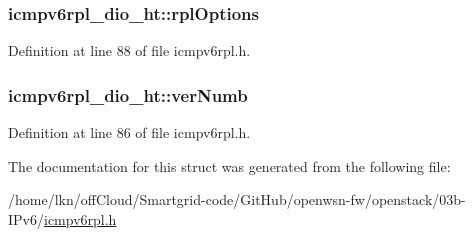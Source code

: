 \subsubsection[{\texorpdfstring{rpl\+Options}{rplOptions}}]{ icmpv6rpl\+\_\+dio\+\_\+ht\+::rpl\+Options}\hypertarget{structicmpv6rpl__dio__ht_a1ba62f69dca7f85acc32147a9646f403}{}\label{structicmpv6rpl__dio__ht_a1ba62f69dca7f85acc32147a9646f403}


Definition at line 88 of file icmpv6rpl.\+h.

\subsubsection[{\texorpdfstring{ver\+Numb}{verNumb}}]{ icmpv6rpl\+\_\+dio\+\_\+ht\+::ver\+Numb}\hypertarget{structicmpv6rpl__dio__ht_a11848f02262ef3eab4ae9fded4efff6e}{}\label{structicmpv6rpl__dio__ht_a11848f02262ef3eab4ae9fded4efff6e}


Definition at line 86 of file icmpv6rpl.\+h.



The documentation for this struct was generated from the following file\+:\begin{DoxyCompactItemize}
\item 
/home/lkn/off\+Cloud/\+Smartgrid-\/code/\+Git\+Hub/openwsn-\/fw/openstack/03b-\/\+I\+Pv6/\hyperlink{icmpv6rpl_8h}{icmpv6rpl.\+h}\end{DoxyCompactItemize}
